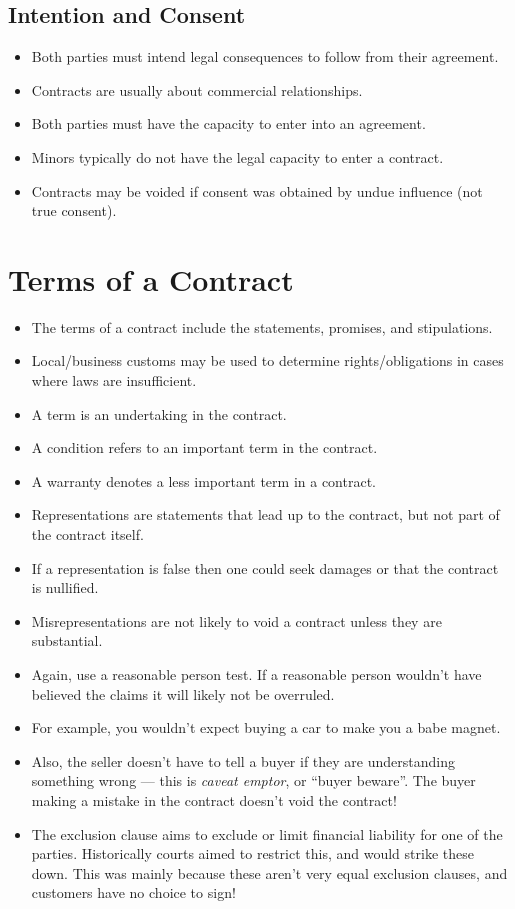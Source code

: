 \documentclass{article}
\begin{document}
\subsection{Intention and Consent}
\begin{itemize}
    \item Both parties must intend legal consequences to follow from their agreement.
    \item Contracts are usually about commercial relationships.
    \item Both parties must have the capacity to enter into an agreement.
    \item Minors typically do not have the legal capacity to enter a contract.
    \item Contracts may be voided if consent was obtained by undue influence (not true consent).
\end{itemize}

\section{Terms of a Contract}
\begin{itemize}
    \item The terms of a contract include the statements, promises, and stipulations.
    \item Local/business customs may be used to determine rights/obligations in cases where laws are insufficient.
    \item A term is an undertaking in the contract.
    \item A condition refers to an important term in the contract.
    \item A warranty denotes a less important term in a contract.
    \item Representations are statements that lead up to the contract, but not part of the contract itself.
    \item If a representation is false then one could seek damages or that the contract is nullified.
    \item Misrepresentations are not likely to void a contract unless they are substantial.
    \item Again, use a reasonable person test.  If a reasonable person wouldn't have believed the claims it will likely not be overruled.
    \item For example, you wouldn't expect buying a car to make you a babe magnet.
    \item Also, the seller doesn't have to tell a buyer if they are understanding something wrong --- this is \emph{caveat emptor}, or ``buyer beware''.  The buyer making a mistake in the contract doesn't void the contract!
    \item The exclusion clause aims to exclude or limit financial liability for one of the parties.  Historically courts aimed to restrict this, and would strike these down.  This was mainly because these aren't very equal exclusion clauses, and customers have no choice to sign!
\end{itemize}
\end{document}
